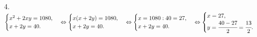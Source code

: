 4. $\begin{cases} x^2+2xy=1080,\\x+2y=40.\end{cases}\Leftrightarrow\begin{cases} x(x+2y)=1080,\\x+2y=40.\end{cases}\Leftrightarrow\begin{cases} x=1080:40=27,\\x+2y=40.\end{cases}\Leftrightarrow\begin{cases} x=27,\\y=\cfrac{40-27}{2}=\cfrac{13}{2}.\end{cases}$\\
